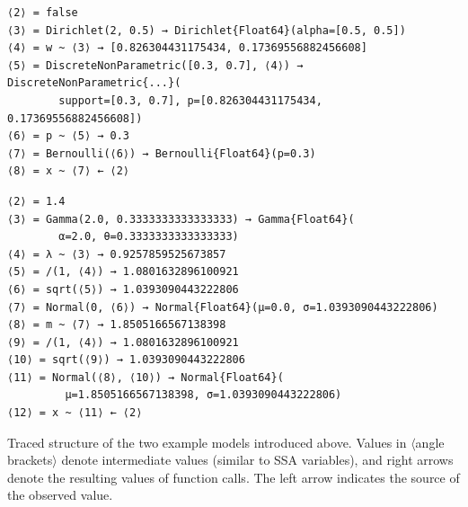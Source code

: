 \newsavebox{\bernoullitrace}
\begin{lrbox}{\bernoullitrace}
\begin{lstlisting}[style=lstfloat]
⟨2⟩ = false
⟨3⟩ = Dirichlet(2, 0.5) → Dirichlet{Float64}(alpha=[0.5, 0.5])
⟨4⟩ = w ~ ⟨3⟩ → [0.826304431175434, 0.17369556882456608]
⟨5⟩ = DiscreteNonParametric([0.3, 0.7], ⟨4⟩) → DiscreteNonParametric{...}(
        support=[0.3, 0.7], p=[0.826304431175434, 0.17369556882456608])
⟨6⟩ = p ~ ⟨5⟩ → 0.3
⟨7⟩ = Bernoulli(⟨6⟩) → Bernoulli{Float64}(p=0.3)
⟨8⟩ = x ~ ⟨7⟩ ← ⟨2⟩
\end{lstlisting}
\end{lrbox}
\newsavebox{\gaussiantrace}
\begin{lrbox}{\gaussiantrace}
\begin{lstlisting}[style=lstfloat]
⟨2⟩ = 1.4
⟨3⟩ = Gamma(2.0, 0.3333333333333333) → Gamma{Float64}(
        α=2.0, θ=0.3333333333333333)
⟨4⟩ = λ ~ ⟨3⟩ → 0.9257859525673857
⟨5⟩ = /(1, ⟨4⟩) → 1.0801632896100921
⟨6⟩ = sqrt(⟨5⟩) → 1.0393090443222806
⟨7⟩ = Normal(0, ⟨6⟩) → Normal{Float64}(μ=0.0, σ=1.0393090443222806)
⟨8⟩ = m ~ ⟨7⟩ → 1.8505166567138398
⟨9⟩ = /(1, ⟨4⟩) → 1.0801632896100921
⟨10⟩ = sqrt(⟨9⟩) → 1.0393090443222806
⟨11⟩ = Normal(⟨8⟩, ⟨10⟩) → Normal{Float64}(
         μ=1.8505166567138398, σ=1.0393090443222806)
⟨12⟩ = x ~ ⟨11⟩ ← ⟨2⟩
\end{lstlisting}
\end{lrbox}
\begin{lstfloat}[p]
  \loosesubcaptions
  \caption{Traced structure of the two example models introduced above.  Values in \(\langle\)angle
    brackets\(\rangle\) denote intermediate values (similar to SSA variables), and right arrows
    denote the resulting values of function calls.  The left arrow indicates the source of the
    observed value.}
  \label{lst:trace-examples}
\end{lstfloat}

\FloatBlock

